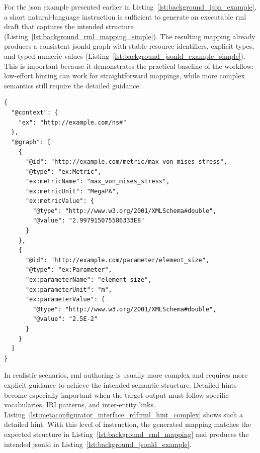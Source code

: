For the \gls{json} example presented earlier in Listing~\ref{lst:background_json_example}, a short natural-language instruction is sufficient to generate an executable \gls{rml} draft that captures the intended structure (Listing~\ref{lst:background_rml_mapping_simple}). The resulting mapping already produces a consistent \gls{jsonld} graph with stable resource identifiers, explicit types, and typed numeric values (Listing~\ref{lst:background_jsonld_example_simple}). This is important because it demonstrates the practical baseline of the workflow: low-effort hinting can work for straightforward mappings, while more complex semantics still require the detailed guidance.

\begin{lstlisting}[float=htbp,style=json, caption={JSON-LD representation of the simulation result, obtained after applying the minimal RML mapping hint shown above}, label={lst:background_jsonld_example_simple}]
{
  "@context": {
    "ex": "http://example.com/ns#"
  },
  "@graph": [
    {
      "@id": "http://example.com/metric/max_von_mises_stress",
      "@type": "ex:Metric",
      "ex:metricName": "max_von_mises_stress",
      "ex:metricUnit": "MegaPA",
      "ex:metricValue": {
        "@type": "http://www.w3.org/2001/XMLSchema#double",
        "@value": "2.997915075586333E8"
      }
    },
    {
      "@id": "http://example.com/parameter/element_size",
      "@type": "ex:Parameter",
      "ex:parameterName": "element_size",
      "ex:parameterUnit": "m",
      "ex:parameterValue": {
        "@type": "http://www.w3.org/2001/XMLSchema#double",
        "@value": "2.5E-2"
      }
    }
  ]
}  
\end{lstlisting}

In realistic scenarios, \gls{rml} authoring is usually more complex and requires more explicit guidance to achieve the intended semantic structure. Detailed hints become especially important when the target output must follow specific vocabularies, IRI patterns, and inter-entity links. Listing~\ref{lst:metaconfigurator_interface_rdf:rml_hint_complex} shows such a detailed hint. With this level of instruction, the generated mapping matches the expected structure in Listing~\ref{lst:background_rml_mapping} and produces the intended \gls{jsonld} in Listing~\ref{lst:background_jsonld_example}. 

